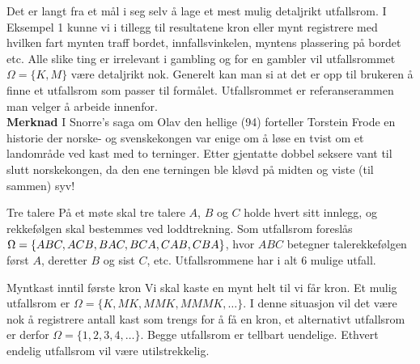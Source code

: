      Det er langt fra et mål i seg selv å lage et mest mulig
detaljrikt utfalls\-rom. I Eksempel 1 kunne vi i tillegg til
resultatene kron eller mynt registrere med hvilken fart mynten
traff bordet, innfallsvinkelen, myntens plassering på bordet
etc. Alle slike ting er irrelevant i gambling og for en gambler
vil utfallsrommet $\Omega=\{K, M\}$ være detaljrikt nok.
Generelt kan man si at det er opp til brukeren å finne et
utfallsrom som passer til formålet. Utfallsrommet er 
referanserammen man velger å arbeide innenfor. \\

\noindent
{\bf Merknad} I Snorre's saga om Olav den hellige (94) forteller
Torstein Frode en historie der norske- og svenskekongen var enige
om å løse en tvist om et landområde ved kast med to terninger.
Etter gjentatte dobbel seksere vant til slutt norskekongen, da den ene
terningen ble kløvd på midten og viste (til sammen) syv! \\

\begin{eksempel}{Tre talere}
På et møte skal tre talere $A$, $B$ og $C$ holde hvert sitt
innlegg, og rekkefølgen skal bestemmes ved loddtrekning. Som
utfallsrom foreslås  $\Omega=\{ABC,\\ ACB, BAC, BCA, CAB, CBA\}$,
hvor $ABC$ betegner talerekkefølgen først $A$, deretter $B$ og
sist $C$, etc. Utfallsrommene har i alt 6 mulige utfall.
\end{eksempel}

\begin{eksempel}{Myntkast inntil første kron}
Vi skal kaste en mynt helt til vi får kron. Et mulig utfallsrom
er $\Omega=\{K, MK, MMK, MMMK,\ldots \}$. I denne situasjon vil det
være nok å regi\-strere antall kast som trengs for å få en
kron, et alternativt utfallsrom er derfor
$\Omega=\{1,2,3,4,\ldots \}$. Begge utfallsrom er tellbart uendelige.
Ethvert endelig utfallsrom vil være utilstrekkelig.
\end{eksempel}

